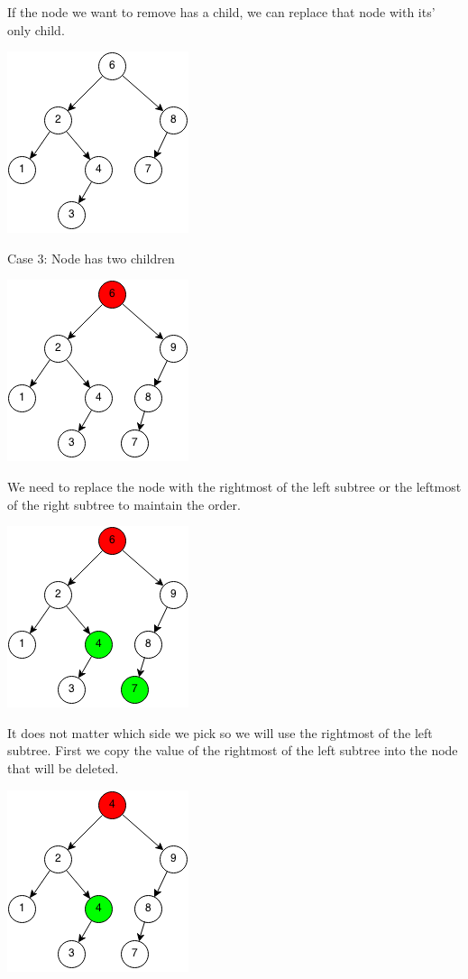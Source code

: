 \documentclass[11pt,oneside]{book}
\makeatletter
\def\maxwidth#1{\ifdim\Gin@nat@width>#1 #1\else\Gin@nat@width\fi}
\makeatother
\begin{document}
If the node we want to remove has a child, we can replace that node with its' only child.

\includegraphics[width=\maxwidth{\textwidth}]{bst-rem-case22.png}

Case 3: Node has two children

\includegraphics[width=\maxwidth{\textwidth}]{bst-rem-case31.png}

We need to replace the node with the rightmost of the left subtree or the leftmost of the right subtree to maintain the order.

\includegraphics[width=\maxwidth{\textwidth}]{bst-rem-case32.png}

It does not matter which side we pick so we will use the rightmost of the left subtree. First we copy the value of the rightmost of the left subtree into the node that will be deleted.

\includegraphics[width=\maxwidth{\textwidth}]{bst-rem-case33.png}
\end{document}
